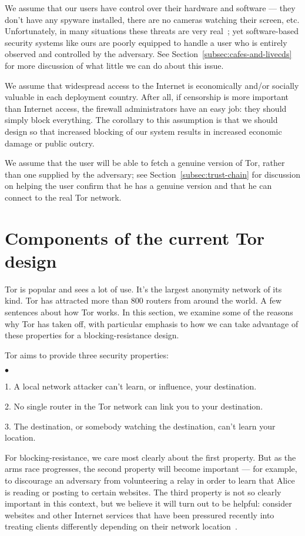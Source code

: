 \documentclass{llncs}
\newenvironment{tightlist}{\begin{list}{$\bullet$}{
  \setlength{\itemsep}{0mm}
    \setlength{\parsep}{0mm}
    }}{\end{list}}
\begin{document}
We assume that our users have control over their hardware and
software --- they don't have any spyware installed, there are no
cameras watching their screen, etc. Unfortunately, in many situations
these threats are very real~\cite{zuckerman-threatmodels}; yet
software-based security systems like ours are poorly equipped to handle
a user who is entirely observed and controlled by the adversary. See
Section~\ref{subsec:cafes-and-livecds} for more discussion of what little
we can do about this issue.

We assume that widespread access to the Internet is economically and/or
socially valuable in each deployment country. After all, if censorship
is more important than Internet access, the firewall administrators have
an easy job: they should simply block everything. The corollary to this
assumption is that we should design so that increased blocking of our
system results in increased economic damage or public outcry.

We assume that the user will be able to fetch a genuine
version of Tor, rather than one supplied by the adversary; see
Section~\ref{subsec:trust-chain} for discussion on helping the user
confirm that he has a genuine version and that he can connect to the
real Tor network.

\section{Components of the current Tor design}
\label{sec:current-tor}

Tor is popular and sees a lot of use. It's the largest anonymity
network of its kind.
Tor has attracted more than 800 routers from around the world.
A few sentences about how Tor works.
In this section, we examine some of the reasons why Tor has taken off,
with particular emphasis to how we can take advantage of these properties
for a blocking-resistance design.

Tor aims to provide three security properties:
\begin{tightlist}
\item 1. A local network attacker can't learn, or influence, your
destination.
\item 2. No single router in the Tor network can link you to your
destination.
\item 3. The destination, or somebody watching the destination,
can't learn your location.
\end{tightlist}

For blocking-resistance, we care most clearly about the first
property. But as the arms race progresses, the second property
will become important --- for example, to discourage an adversary
from volunteering a relay in order to learn that Alice is reading
or posting to certain websites. The third property is not so clearly
important in this context, but we believe it will turn out to be helpful:
consider websites and other Internet services that have been pressured
recently into treating clients differently depending on their network
location~\cite{google-geolocation}.
\end{document}
